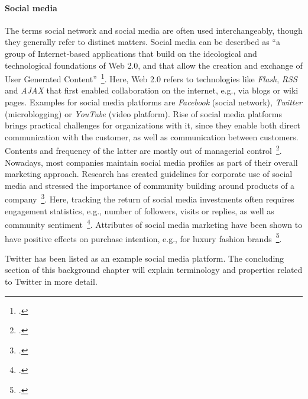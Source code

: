 \paragraph{Social media}
\label{sub:sn_social_media}

The terms social network and social media are often used interchangeably, though
they generally refer to distinct matters.
Social media can be described as ``a group of Internet-based applications that
build on the ideological and technological foundations of Web 2.0, and that allow
the creation and exchange of User Generated Content''~\footcite[61]{Kaplan2010}.
Here, Web 2.0 refers to technologies like \textit{Flash}, \textit{RSS} and 
\textit{AJAX} that first enabled collaboration on the internet, e.g., via blogs
or wiki pages.
Examples for social media platforms are \textit{Facebook} (social network), 
\textit{Twitter} (microblogging) or \textit{YouTube} (video platform).
Rise of social media platforms brings practical challenges for organizations with it,
since they enable both direct communication with the customer, as well as
communication between customers.
Contents and frequency of the latter are mostly out of managerial control~\footcite{Mangold2009}.
Nowadays, most companies maintain social media profiles as part of their overall
marketing approach.
Research has created guidelines for corporate use of social media and stressed the
importance of community building around products of a company~\footcite{Culnan2010}.
Here, tracking the return of social media investments often requires engagement
statistics, e.g., number of followers, visits or replies, as well as community
sentiment~\footcite{Hoffman2010}.
Attributes of social media marketing have been shown to have positive effects
on purchase intention, e.g., for luxury fashion brands~\footcite{Kim2012}.

Twitter has been listed as an example social media platform.
The concluding section of this background chapter will explain terminology
and properties related to Twitter in more detail.
